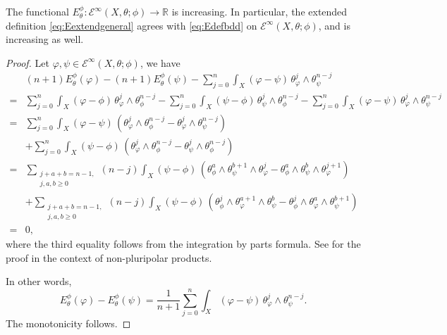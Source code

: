 \begin{lemma}\label{lma:EmonoEinfty}
    The functional $E_{\theta}^{\phi}\colon \mathcal{E}^{\infty}(X,\theta;\phi)\rightarrow \mathbb{R}$ is increasing. In particular, the extended definition \eqref{eq:Eextendgeneral} agrees with \eqref{eq:Edefbdd} on $\mathcal{E}^{\infty}(X,\theta;\phi)$, and is increasing as well.
\end{lemma}
\begin{proof}
    Let $\varphi,\psi\in \mathcal{E}^{\infty}(X,\theta;\phi)$, we have
    \[
    \begin{aligned}
    &(n+1)E^{\phi}_{\theta}(\varphi)-(n+1)E^{\phi}_{\theta}(\psi)-\sum_{j=0}^n \int_X (\varphi-\psi)\,\theta_{\varphi}^j\wedge \theta_{\psi}^{n-j} \\
    =& \sum_{j=0}^n \int_X (\varphi-\phi)\, \theta_{\varphi}^j\wedge \theta_{\phi}^{n-j}-\sum_{j=0}^n \int_X (\psi-\phi)\, \theta_{\psi}^j\wedge \theta_{\phi}^{n-j}-\sum_{j=0}^n \int_X (\varphi-\psi)\,\theta_{\varphi}^j\wedge \theta_{\psi}^{n-j}\\
    =& \sum_{j=0}^n \int_X (\varphi-\psi)\,\left( \theta_{\varphi}^j\wedge \theta_{\phi}^{n-j}-\theta_{\varphi}^j\wedge \theta_{\psi}^{n-j} \right)\\
    &+\sum_{j=0}^n \int_X (\psi-\phi)\,\left( \theta_{\varphi}^j\wedge \theta_{\phi}^{n-j}-\theta_{\psi}^j\wedge \theta_{\phi}^{n-j} \right)\\
    =& \sum_{\substack{j+a+b=n-1,\\ j,a,b\geq 0}} (n-j)\int_X (\psi-\phi)\,\left( \theta_{\phi}^a\wedge \theta_{\psi}^{b+1}\wedge \theta_{\varphi}^j- \theta_{\phi}^a\wedge \theta_{\psi}^{b}\wedge \theta_{\varphi}^{j+1}\right)\\
    &+\sum_{\substack{j+a+b=n-1,\\ j,a,b\geq 0}} (n-j)\int_X (\psi-\phi)\,\left( \theta_{\phi}^j\wedge \theta_{\varphi}^{a+1}\wedge \theta_{\psi}^b- \theta_{\phi}^j\wedge \theta_{\varphi}^{a}\wedge \theta_{\psi}^{b+1}\right)\\
    =&0,
    \end{aligned}
    \]
    where the third equality follows from the integration by parts formula. See \cite{Xia19b, Lu21} for the proof in the context of non-pluripolar products.

    In other words,
    \begin{equation}\label{eq:int_by_part_E_temp1}
    E^{\phi}_{\theta}(\varphi)-E^{\phi}_{\theta}(\psi)=\frac{1}{n+1}\sum_{j=0}^n \int_X(\varphi-\psi)\,\theta_{\varphi}^j\wedge \theta_{\psi}^{n-j}.
    \end{equation}
    The monotonicity follows.
\end{proof}


